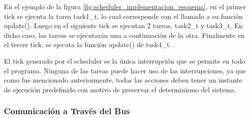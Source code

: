 

En el ejemplo de la figura \ref{fig:scheduler_implementacion_esquema}, en el primer tick se ejecuta la tarea task1\_t, lo cual corresponde con el llamado a su función update(). Luego en el siguiente tick se ejecutan 2 tareas, task2\_t y task3\_t. En dicho caso, las tareas se ejecutarán una a continuación de la otra. Finalmente en el tercer tick, se ejecuta la función update() de task4\_t.

El tick generado por el scheduler es la única interrupción que se permite en todo el programa. Ninguna de las tareas puede hacer uso de las interrupciones, ya que como fue mencionado anteriormente, todas las acciones deben tener un instante de ejecución predefinido con motivo de preservar el determinismo del sistema.


\subsubsection{Comunicación a Través del Bus}


